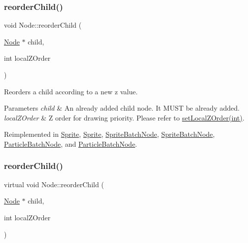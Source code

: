 \subsubsection{\texorpdfstring{reorder\+Child()}{reorderChild()}\hspace{0.1cm}{\footnotesize\ttfamily [1/2]}}
{\footnotesize\ttfamily void Node\+::reorder\+Child (\begin{DoxyParamCaption}\item[{\hyperlink{classNode}{Node} $\ast$}]{child,  }\item[{int}]{local\+Z\+Order }\end{DoxyParamCaption})\hspace{0.3cm}{\ttfamily [virtual]}}

Reorders a child according to a new z value.


\begin{DoxyParams}{Parameters}
{\em child} & An already added child node. It M\+U\+ST be already added. \\
\hline
{\em local\+Z\+Order} & Z order for drawing priority. Please refer to \hyperlink{classNode_aee4e616c2d55b722226aae1e68b4946f}{set\+Local\+Z\+Order(int)}. \\
\hline
\end{DoxyParams}


Reimplemented in \hyperlink{classSprite_a1b21c65760769e17477ae02ce75adf9f}{Sprite}, \hyperlink{classSprite_a128a1da95c110579928bdef1c3dacc78}{Sprite}, \hyperlink{classSpriteBatchNode_a8125810f4a9d5e1c4a4c82cd906baafd}{Sprite\+Batch\+Node}, \hyperlink{classSpriteBatchNode_a9f4e7d0be49a3c044424624ea283c301}{Sprite\+Batch\+Node}, \hyperlink{classParticleBatchNode_ab872c436a2cb7058f589aa7d16bcdd06}{Particle\+Batch\+Node}, and \hyperlink{classParticleBatchNode_a252befcd88cd095ab65809e94bb852ad}{Particle\+Batch\+Node}.

\mbox{\label{classNode_a3bbfa613acd0eba2e67ae8274e8114ee}} 
\subsubsection{\texorpdfstring{reorder\+Child()}{reorderChild()}\hspace{0.1cm}{\footnotesize\ttfamily [2/2]}}
{\footnotesize\ttfamily virtual void Node\+::reorder\+Child (\begin{DoxyParamCaption}\item[{\hyperlink{classNode}{Node} $\ast$}]{child,  }\item[{int}]{local\+Z\+Order }\end{DoxyParamCaption})\hspace{0.3cm}{\ttfamily [virtual]}}

